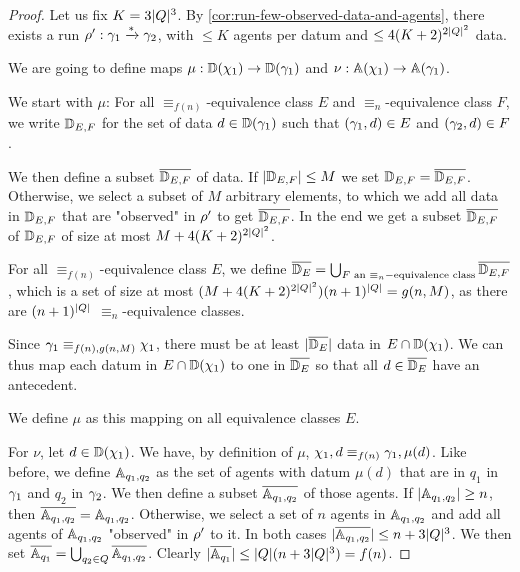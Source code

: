 \begin{proof}
	Let us fix $K=3|Q|^3$. By \cref{cor:run-few-observed-data-and-agents}, there exists a run $\rho' : \gamma_1 \xrightarrow{*} \gamma_2$, with $\leq K$ agents per datum and $\leq 4(K+2)^{2|Q|^2}$ data.
	
	We are going to define maps $\mu : \mathbb{D}(\chi_1) \to \mathbb{D}(\gamma_1)$ and $\nu : \mathbb{A}(\chi_1) \to \mathbb{A}(\gamma_1)$.
	
	We start with $\mu$: For all $\equiv_{f(n)}$-equivalence class $E$ and $\equiv_{n}$-equivalence class $F$, we write $\mathbb{D}_{E,F}$ for the set of data $d \in \mathbb{D}(\gamma_1)$ such that $(\gamma_1, d) \in E$ and $(\gamma_2, d) \in F$.
	
	We then define a subset $\overline{\mathbb{D}_{E,F}}$ of data.
	If $|\mathbb{D}_{E,F}| \leq M$ we set $\mathbb{D}_{E,F} = \overline{\mathbb{D}_{E,F}}$. Otherwise, we select a subset of $M$ arbitrary elements, to which we add all data in $\mathbb{D}_{E,F}$ that are "observed" in $\rho'$ to get $\overline{\mathbb{D}_{E,F}}$.
	In the end we get a subset $\overline{\mathbb{D}_{E,F}}$ of $\mathbb{D}_{E,F}$ of size at most $M+4(K+2)^{2|Q|^2}$.
	
	For all $\equiv_{f(n)}$-equivalence class $E$, we define $\overline{\mathbb{D}_{E}} = \bigcup_{F\text{ an }\equiv_n-\text{equivalence class}} \overline{\mathbb{D}_{E,F}}$, which is a set of size at most $(M+4(K+2)^{2|Q|^2})(n+1)^{|Q|} = g(n,M)$, as there are $(n+1)^{|Q|}$ $\equiv_n$-equivalence classes.
	
 Since $\gamma_1 \equiv_{f(n),g(n,M)} \chi_1$, there must be at least $|\overline{\mathbb{D}_{E}}|$ data in $E \cap \mathbb{D}(\chi_1)$. We can thus map each datum in $E \cap \mathbb{D}(\chi_1)$ to one in $\overline{\mathbb{D}_{E}}$ so that all $d \in \overline{\mathbb{D}_{E}}$ have an antecedent.
 
 We define $\mu$ as this mapping on all equivalence classes $E$.
	
For $\nu$, let $d \in \mathbb{D}(\chi_1)$. We have, by definition of $\mu$, $\chi_1, d \equiv_{f(n)} \gamma_1, \mu(d)$. Like before, we define $\mathbb{A}_{ q_1, q_2}$ as the set of agents with datum $\mu(d)$ that are in $q_1$ in $\gamma_1$ and $q_2$ in $\gamma_2$.
We then define a subset $\overline{\mathbb{A}_{q_1, q_2}}$ of those agents. If $|\mathbb{A}_{q_1, q_2}| \geq n$, then $\overline{\mathbb{A}_{q_1, q_2}} = \mathbb{A}_{q_1, q_2}$. Otherwise, we select a set of $n$ agents in $\mathbb{A}_{q_1, q_2}$ and add all agents of $\mathbb{A}_{q_1, q_2}$ "observed" in $\rho'$ to it. In both cases $|\overline{\mathbb{A}_{q_1, q_2}}| \leq n+3|Q|^3$.
We then set $\overline{\mathbb{A}_{q_1}} = \bigcup_{q_2 \in Q} \overline{\mathbb{A}_{q_1, q_2}}$. Clearly $|\overline{\mathbb{A}_{q_1}}| \leq |Q|(n+3|Q|^3)=f(n)$. 

\end{proof}